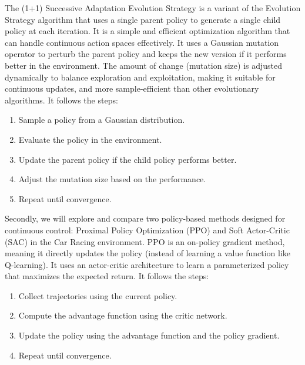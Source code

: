 \documentclass[../CSC_52081_EP.tex]{subfiles}
\begin{document}
    The (1+1) Successive Adaptation Evolution Strategy is a variant of the Evolution Strategy algorithm that uses a single parent policy to generate a single child policy at each iteration.
    It is a simple and efficient optimization algorithm that can handle continuous action spaces effectively. It uses a Gaussian mutation operator to perturb the parent policy and keeps the new version if it performs better in the environment.
    The amount of change (mutation size) is adjusted dynamically to balance exploration and exploitation, making it suitable for continuous updates, and more sample-efficient than other evolutionary algorithms. It follows the steps:
    \begin{enumerate}
        \item Sample a policy from a Gaussian distribution.
        \item Evaluate the policy in the environment.
        \item Update the parent policy if the child policy performs better.
        \item Adjust the mutation size based on the performance.
        \item Repeat until convergence.
    \end{enumerate}
    

    Secondly, we will explore and compare two policy-based methods designed for continuous control: Proximal Policy Optimization (PPO) \cite{PPO} and Soft Actor-Critic (SAC) \cite{SAC} in the Car Racing environment.
    PPO is an on-policy gradient method, meaning it directly updates the policy (instead of learning a value function like Q-learning). It uses an actor-critic architecture to learn a parameterized policy that maximizes the expected return. It follows the steps:
    \begin{enumerate}
        \item Collect trajectories using the current policy.
        \item Compute the advantage function using the critic network.
        \item Update the policy using the advantage function and the policy gradient.
        \item Repeat until convergence.
    \end{enumerate}
\end{document}
